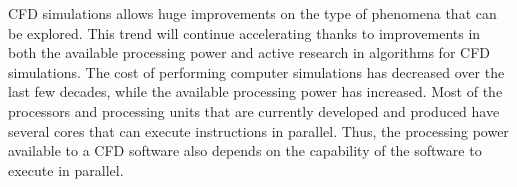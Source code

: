 CFD simulations allows huge improvements on the type of phenomena that can be explored. This trend will continue accelerating thanks to improvements in both the available processing power and active research in algorithms for CFD simulations. The cost of performing computer simulations has decreased over the last few decades, while the available processing power has increased. Most of the processors and processing units that are currently developed and produced have several cores that can execute instructions in parallel. Thus, the processing power available to a CFD software also depends on the capability of the software to execute in parallel.



%
%
%
%


